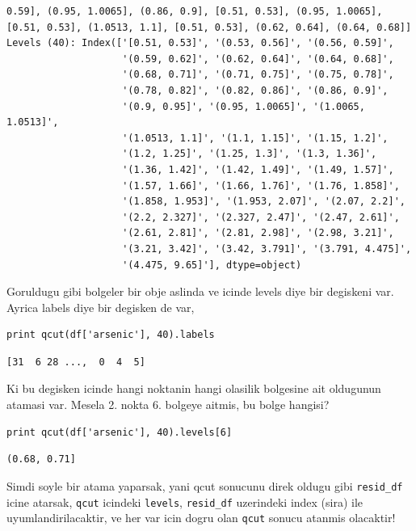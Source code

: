 \documentclass[12pt,fleqn]{article}\usepackage{../common}
\begin{document}
\begin{verbatim}
0.59], (0.95, 1.0065], (0.86, 0.9], [0.51, 0.53], (0.95, 1.0065], [0.51, 0.53], (1.0513, 1.1], [0.51, 0.53], (0.62, 0.64], (0.64, 0.68]]
Levels (40): Index(['[0.51, 0.53]', '(0.53, 0.56]', '(0.56, 0.59]',
                    '(0.59, 0.62]', '(0.62, 0.64]', '(0.64, 0.68]',
                    '(0.68, 0.71]', '(0.71, 0.75]', '(0.75, 0.78]',
                    '(0.78, 0.82]', '(0.82, 0.86]', '(0.86, 0.9]',
                    '(0.9, 0.95]', '(0.95, 1.0065]', '(1.0065, 1.0513]',
                    '(1.0513, 1.1]', '(1.1, 1.15]', '(1.15, 1.2]',
                    '(1.2, 1.25]', '(1.25, 1.3]', '(1.3, 1.36]',
                    '(1.36, 1.42]', '(1.42, 1.49]', '(1.49, 1.57]',
                    '(1.57, 1.66]', '(1.66, 1.76]', '(1.76, 1.858]',
                    '(1.858, 1.953]', '(1.953, 2.07]', '(2.07, 2.2]',
                    '(2.2, 2.327]', '(2.327, 2.47]', '(2.47, 2.61]',
                    '(2.61, 2.81]', '(2.81, 2.98]', '(2.98, 3.21]',
                    '(3.21, 3.42]', '(3.42, 3.791]', '(3.791, 4.475]',
                    '(4.475, 9.65]'], dtype=object)
\end{verbatim}

Goruldugu gibi bolgeler bir obje aslinda ve icinde levels diye bir
degiskeni var. Ayrica labels diye bir degisken de var,


\begin{verbatim}
print qcut(df['arsenic'], 40).labels
\end{verbatim}

\begin{verbatim}
[31  6 28 ...,  0  4  5]
\end{verbatim}

Ki bu degisken icinde hangi noktanin hangi olasilik bolgesine ait oldugunun
atamasi var. Mesela 2. nokta 6. bolgeye aitmis, bu bolge hangisi?

\begin{verbatim}
print qcut(df['arsenic'], 40).levels[6]
\end{verbatim}

\begin{verbatim}
(0.68, 0.71]
\end{verbatim}

Simdi soyle bir atama yaparsak, yani qcut sonucunu direk oldugu gibi
\verb!resid_df! icine atarsak, \verb!qcut! icindeki \verb!levels!,
\verb!resid_df!  uzerindeki index (sira) ile uyumlandirilacaktir, ve her
var icin dogru olan \verb!qcut! sonucu atanmis olacaktir!
\end{document}
